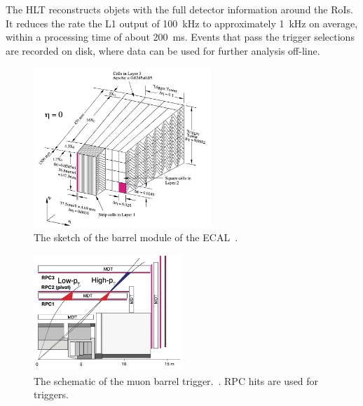 The HLT reconstructs objets with the full detector information around the RoIs. 
It reduces the rate the L1 output of 100~kHz to approximately 1~kHz on average, within a processing time of about 200~ms.
Events that pass the trigger selections are recorded on disk, where data can be used for further analysis off-line.
\begin{figure}[tbp]
\begin{center}
 \includegraphics[width=0.6\textwidth,keepaspectratio]{figures/detector/TriggerTower}
\caption{
The sketch of the barrel module of the ECAL~\cite{PERF-2007-01}.
}
\label{fig:TriggerTower}
\end{center}
\end{figure}

\begin{figure}[tbp]
\centering
\begin{center}
 \includegraphics[width=0.5\textwidth,keepaspectratio]{figures/detector/muontrigger}
\caption{
The schematic of the muon barrel trigger.~\cite{PERF-2007-01}. RPC hits are used for triggers.
}
\label{fig:muontrigger}
\end{center}
\end{figure}


